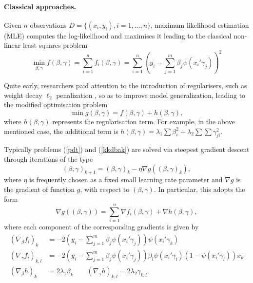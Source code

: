 \paragraph{Classical approaches.}\label{sanchez}

Given $n$ observations $D=\{ (x_i, y_i), i=1,...,n \}$,
 maximum likelihood estimation (MLE) 
 computes the log-likelihood and maximises it 
leading to the classical non-linear least squares problem
\begin{equation}\label{pdt}
 \min_{\beta , \gamma } f (\beta , \gamma) = \sum _{i=1}^n f_i(\beta, \gamma)  =\sum _{i=1}^n \left( y_i -
  \sum_{j=1}^m \beta_j \psi(x_i'\gamma_j) \right)^2 
 \end{equation}

\noindent Quite early, researchers paid attention to the introduction of regularisers, such as weight decay $\ell_2$ penalization \parencite{krogh1992simple}, so as to improve model 
generalization, leading to the modified optimisation problem
\begin{equation}\label{kkdbak}
 \min  g(\beta ,\gamma) = f (\beta ,\gamma ) +
 h (\beta ,\gamma ), \end{equation}
where $h(\beta , \gamma )$ represents the regularisation 
term. For example, in the above mentioned case, the 
additional term is  
$h(\beta , \gamma )= \lambda _1 \sum \beta_i ^2 +
\lambda _2 \sum \sum \gamma _{ji} ^2$. 

Typically problems (\ref{pdt}) and (\ref{kkdbak}) are solved via steepest gradient descent \parencite{meza} through iterations of the type
\[
   (\beta, \gamma )_{k+1}=
   (\beta, \gamma )_{k}- \eta \nabla g (  (\beta, \gamma )_{k} ),
   \]
where $\eta $ is frequently chosen as a fixed small learning rate parameter and $\nabla g $ is the gradient of function $g$, with respect to 
$(\beta ,\gamma )$. In particular, this adopts the form 
\begin{equation}\label{gradiente1}
    \nabla g (  (\beta, \gamma )  )= \sum _{i=1}^n   \nabla f_i(\beta, \gamma) +  \nabla  h(\beta, \gamma),
    \end{equation}
    where each component of the corresponding gradients is given by 
\begin{align*}
(\nabla_\beta f_i)_k &= -2  \left(y_i - \sum_{j=1}^m \beta_j \psi(x_i' \gamma_j)\right) \psi(x_i' \gamma_k) \\
(\nabla_\gamma f_i)_{k,l} &= -2 \left (y_i - \sum_{j=1}^m \beta_j \psi(x_i' \gamma_j)\right) \beta_l \psi(x_i' \gamma_l)(1 - \psi(x_i' \gamma_l)) x_k \\
(\nabla_\beta h)_k &= 2\lambda_1 \beta_k  \qquad (\nabla_\gamma h)_{k,l} = 2\lambda_2 \gamma_{k,l}.
\end{align*}

